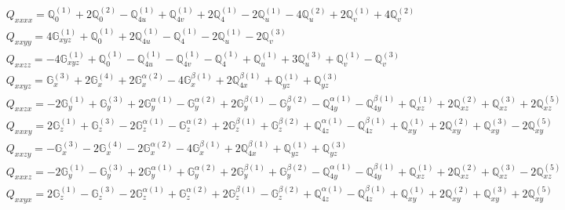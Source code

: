 \documentclass[fleqn,8pt,landscape]{jsarticle}
\begin{document}
\begin{align*}
& Q_{xxxx} = \mathbb{Q}_{0}^{(1)} + 2 \mathbb{Q}_{0}^{(2)} - \mathbb{Q}_{4u}^{(1)} + \mathbb{Q}_{4v}^{(1)} + 2 \mathbb{Q}_{4}^{(1)} - 2 \mathbb{Q}_{u}^{(1)} - 4 \mathbb{Q}_{u}^{(2)} + 2 \mathbb{Q}_{v}^{(1)} + 4 \mathbb{Q}_{v}^{(2)} \\
& Q_{xxyy} = 4 \mathbb{G}_{xyz}^{(1)} + \mathbb{Q}_{0}^{(1)} + 2 \mathbb{Q}_{4u}^{(1)} - \mathbb{Q}_{4}^{(1)} - 2 \mathbb{Q}_{u}^{(1)} - 2 \mathbb{Q}_{v}^{(3)} \\
& Q_{xxzz} = - 4 \mathbb{G}_{xyz}^{(1)} + \mathbb{Q}_{0}^{(1)} - \mathbb{Q}_{4u}^{(1)} - \mathbb{Q}_{4v}^{(1)} - \mathbb{Q}_{4}^{(1)} + \mathbb{Q}_{u}^{(1)} + 3 \mathbb{Q}_{u}^{(3)} + \mathbb{Q}_{v}^{(1)} - \mathbb{Q}_{v}^{(3)} \\
& Q_{xxyz} = \mathbb{G}_{x}^{(3)} + 2 \mathbb{G}_{x}^{(4)} + 2 \mathbb{G}_{x}^{\alpha(2)} - 4 \mathbb{G}_{x}^{\beta(1)} + 2 \mathbb{Q}_{4x}^{\beta(1)} + \mathbb{Q}_{yz}^{(1)} + \mathbb{Q}_{yz}^{(3)} \\
& Q_{xxzx} = - 2 \mathbb{G}_{y}^{(1)} + \mathbb{G}_{y}^{(3)} + 2 \mathbb{G}_{y}^{\alpha(1)} - \mathbb{G}_{y}^{\alpha(2)} + 2 \mathbb{G}_{y}^{\beta(1)} - \mathbb{G}_{y}^{\beta(2)} - \mathbb{Q}_{4y}^{\alpha(1)} - \mathbb{Q}_{4y}^{\beta(1)} + \mathbb{Q}_{xz}^{(1)} + 2 \mathbb{Q}_{xz}^{(2)} + \mathbb{Q}_{xz}^{(3)} + 2 \mathbb{Q}_{xz}^{(5)} \\
& Q_{xxxy} = 2 \mathbb{G}_{z}^{(1)} + \mathbb{G}_{z}^{(3)} - 2 \mathbb{G}_{z}^{\alpha(1)} - \mathbb{G}_{z}^{\alpha(2)} + 2 \mathbb{G}_{z}^{\beta(1)} + \mathbb{G}_{z}^{\beta(2)} + \mathbb{Q}_{4z}^{\alpha(1)} - \mathbb{Q}_{4z}^{\beta(1)} + \mathbb{Q}_{xy}^{(1)} + 2 \mathbb{Q}_{xy}^{(2)} + \mathbb{Q}_{xy}^{(3)} - 2 \mathbb{Q}_{xy}^{(5)} \\
& Q_{xxzy} = - \mathbb{G}_{x}^{(3)} - 2 \mathbb{G}_{x}^{(4)} - 2 \mathbb{G}_{x}^{\alpha(2)} - 4 \mathbb{G}_{x}^{\beta(1)} + 2 \mathbb{Q}_{4x}^{\beta(1)} + \mathbb{Q}_{yz}^{(1)} + \mathbb{Q}_{yz}^{(3)} \\
& Q_{xxxz} = - 2 \mathbb{G}_{y}^{(1)} - \mathbb{G}_{y}^{(3)} + 2 \mathbb{G}_{y}^{\alpha(1)} + \mathbb{G}_{y}^{\alpha(2)} + 2 \mathbb{G}_{y}^{\beta(1)} + \mathbb{G}_{y}^{\beta(2)} - \mathbb{Q}_{4y}^{\alpha(1)} - \mathbb{Q}_{4y}^{\beta(1)} + \mathbb{Q}_{xz}^{(1)} + 2 \mathbb{Q}_{xz}^{(2)} + \mathbb{Q}_{xz}^{(3)} - 2 \mathbb{Q}_{xz}^{(5)} \\
& Q_{xxyx} = 2 \mathbb{G}_{z}^{(1)} - \mathbb{G}_{z}^{(3)} - 2 \mathbb{G}_{z}^{\alpha(1)} + \mathbb{G}_{z}^{\alpha(2)} + 2 \mathbb{G}_{z}^{\beta(1)} - \mathbb{G}_{z}^{\beta(2)} + \mathbb{Q}_{4z}^{\alpha(1)} - \mathbb{Q}_{4z}^{\beta(1)} + \mathbb{Q}_{xy}^{(1)} + 2 \mathbb{Q}_{xy}^{(2)} + \mathbb{Q}_{xy}^{(3)} + 2 \mathbb{Q}_{xy}^{(5)} \\

\end{align*}
\end{document}

